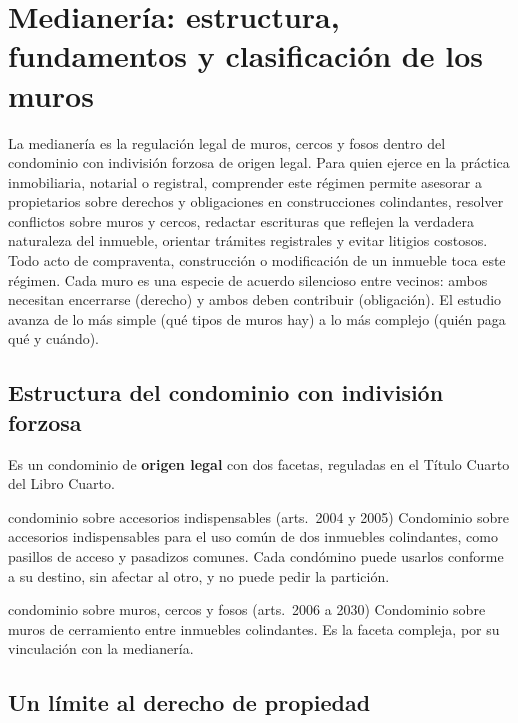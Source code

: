 \documentclass[12pt,oneside]{book}
\begin{document}
\chapter[Medianería: estructura, fundamentos y clasificación de los muros]{Medianería: estructura, fundamentos y clasificación de los muros}\label{cap:medianeria}

La medianería es la regulación legal de muros, cercos y fosos dentro del condominio con indivisión forzosa de origen legal. Para quien ejerce en la práctica inmobiliaria, notarial o registral, comprender este régimen permite asesorar a propietarios sobre derechos y obligaciones en construcciones colindantes, resolver conflictos sobre muros y cercos, redactar escrituras que reflejen la verdadera naturaleza del inmueble, orientar trámites registrales y evitar litigios costosos. Todo acto de compraventa, construcción o modificación de un inmueble toca este régimen. Cada muro es una especie de acuerdo silencioso entre vecinos: ambos necesitan encerrarse (derecho) y ambos deben contribuir (obligación). El estudio avanza de lo más simple (qué tipos de muros hay) a lo más complejo (quién paga qué y cuándo).

\section{Estructura del condominio con indivisión forzosa}

Es un condominio de \textbf{origen legal} con dos facetas, reguladas en el Título Cuarto del Libro Cuarto.

\begin{definicion}{condominio sobre accesorios indispensables (arts.~2004 y 2005)}
Condominio sobre accesorios indispensables para el uso común de dos inmuebles colindantes, como pasillos de acceso y pasadizos comunes. Cada condómino puede usarlos conforme a su destino, sin afectar al otro, y no puede pedir la partición.
\end{definicion}

\begin{definicion}{condominio sobre muros, cercos y fosos (arts.~2006 a 2030)}
Condominio sobre muros de cerramiento entre inmuebles colindantes. Es la faceta compleja, por su vinculación con la medianería.
\end{definicion}

\section{Un límite al derecho de propiedad}
\end{document}
